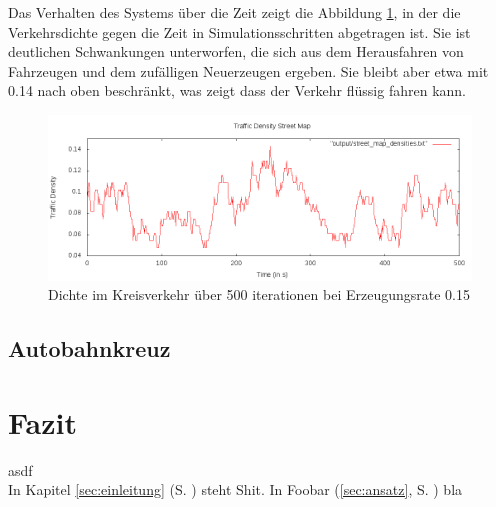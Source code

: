\documentclass[11pt, a4paper]{article}
\newcommand\myref[1]{\ref{#1} (S. \pageref{#1})}
\newcommand\myrefcomma[1]{\ref{#1}, S. \pageref{#1}}
\begin{document}
Das Verhalten des Systems über die Zeit zeigt die Abbildung \ref{fig:roundabout015density}, in der die Verkehrsdichte gegen die Zeit in Simulationsschritten abgetragen ist. Sie ist deutlichen Schwankungen unterworfen, die sich aus dem Herausfahren von Fahrzeugen und dem zufälligen Neuerzeugen ergeben. Sie bleibt aber etwa mit 0.14 nach oben beschränkt, was zeigt dass der Verkehr flüssig fahren kann.
\begin{figure}[h!]
	\centering
	\includegraphics[width=\textwidth]{img/roundabout_015_densities}
	\caption{Dichte im Kreisverkehr über 500 iterationen bei Erzeugungsrate 0.15}
	\label{fig:roundabout015density}
\end{figure}

\subsection{Autobahnkreuz}

\newpage
\section{Fazit}
\label{sec:fazit}

\blindtext asdf \cite{mehrspurig}\\
In Kapitel \myref{sec:einleitung} steht Shit. In Foobar (\myrefcomma{sec:ansatz}) bla

\newpage
{}
{}

\end{document}
